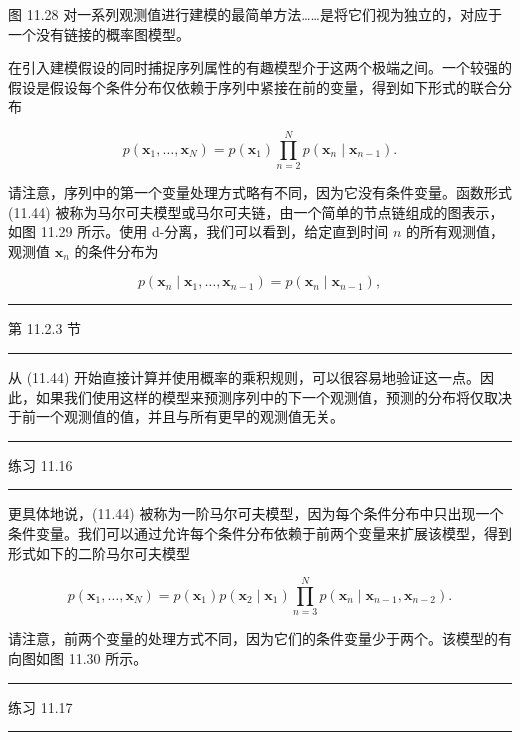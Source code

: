 \documentclass[10pt]{article}
\newcommand{\HRule}{\begin{center}\rule{0.9\linewidth}{0.2mm}\end{center}}
\begin{document}
图 11.28 对一系列观测值进行建模的最简单方法……是将它们视为独立的，对应于一个没有链接的概率图模型。

在引入建模假设的同时捕捉序列属性的有趣模型介于这两个极端之间。一个较强的假设是假设每个条件分布仅依赖于序列中紧接在前的变量，得到如下形式的联合分布

\[
p\left( {{\mathbf{x}}_{1},\ldots ,{\mathbf{x}}_{N}}\right)  = p\left( {\mathbf{x}}_{1}\right) \mathop{\prod }\limits_{{n = 2}}^{N}p\left( {{\mathbf{x}}_{n} \mid  {\mathbf{x}}_{n - 1}}\right) . \tag{11.44}
\]

请注意，序列中的第一个变量处理方式略有不同，因为它没有条件变量。函数形式 (11.44) 被称为马尔可夫模型或马尔可夫链，由一个简单的节点链组成的图表示，如图 11.29 所示。使用 d-分离，我们可以看到，给定直到时间 \(n\) 的所有观测值，观测值 \({\mathbf{x}}_{n}\) 的条件分布为

\[
p\left( {{\mathbf{x}}_{n} \mid  {\mathbf{x}}_{1},\ldots ,{\mathbf{x}}_{n - 1}}\right)  = p\left( {{\mathbf{x}}_{n} \mid  {\mathbf{x}}_{n - 1}}\right) , \tag{11.45}
\]

\HRule

第 11.2.3 节

\HRule

从 (11.44) 开始直接计算并使用概率的乘积规则，可以很容易地验证这一点。因此，如果我们使用这样的模型来预测序列中的下一个观测值，预测的分布将仅取决于前一个观测值的值，并且与所有更早的观测值无关。

\HRule

练习 11.16

\HRule

更具体地说，(11.44) 被称为一阶马尔可夫模型，因为每个条件分布中只出现一个条件变量。我们可以通过允许每个条件分布依赖于前两个变量来扩展该模型，得到形式如下的二阶马尔可夫模型

\[
p\left( {{\mathbf{x}}_{1},\ldots ,{\mathbf{x}}_{N}}\right)  = p\left( {\mathbf{x}}_{1}\right) p\left( {{\mathbf{x}}_{2} \mid  {\mathbf{x}}_{1}}\right) \mathop{\prod }\limits_{{n = 3}}^{N}p\left( {{\mathbf{x}}_{n} \mid  {\mathbf{x}}_{n - 1},{\mathbf{x}}_{n - 2}}\right) . \tag{11.46}
\]

请注意，前两个变量的处理方式不同，因为它们的条件变量少于两个。该模型的有向图如图 11.30 所示。

\HRule

练习 11.17

\HRule
\end{document}
